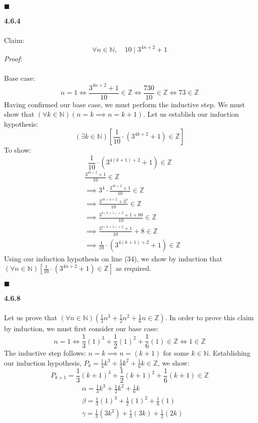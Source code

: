\documentclass[12pt]{article}
\begin{document}
\begin{flushright}
$\blacksquare$
\end{flushright}
\textbf{4.6.4}\\\\
Claim: $$\forall n \in \mathbb{N}, \quad 10 \mid 3^{4n+2}+1$$
\emph{Proof}:\\\\
Base case: $$n=1 \iff \frac{3^{4n+2}+1}{10} \in \mathbb{Z} \iff \frac{730}{10} \in \mathbb{Z} \iff 73 \in \mathbb{Z}$$
Having confirmed our base case, we must perform the inductive step. We must show that $(\forall k \in \mathbb{N})(n=k \implies n=k+1)$. Let us establish our induction hypothesis: $$(\exists k \in \mathbb{N})\left[\frac{1}{10}\cdot (3^{4k+2}+1) \in \mathbb{Z}\right]$$
To show: $$\boxed{\frac{1}{10}\cdot (3^{4(k+1)+2}+1) \in \mathbb{Z}}$$
\begin{align}
& \frac{3^{4k+2}+1}{10} \in \mathbb{Z}\\
&\implies 3^4 \cdot \frac{3^{4k+2}+1}{10} \in \mathbb{Z}\\
&\implies \frac{3^{4k+4+2}+3^4}{10} \in \mathbb{Z}\\
&\implies \frac{3^{4(k+1)+2}+1+80}{10} \in \mathbb{Z}\\
&\implies \frac{3^{4(k+1)+2}+1}{10}+8 \in \mathbb{Z}\\
&\implies \frac{1}{10}\cdot (3^{4(k+1)+2}+1) \in \mathbb{Z}
\end{align}
Using our induction hypothesis on line (34), we show by induction that $(\forall n \in \mathbb{N})\left[\frac{1}{10}\cdot (3^{4n+2}+1) \in \mathbb{Z}\right]$ as required.
\begin{flushright}
$\blacksquare$
\end{flushright}
\textbf{4.6.8}\\\\
Let us prove that $(\forall n \in \mathbb{N})\left(\frac{1}{3}n^3+\frac{1}{2}n^2+\frac{1}{6}n \in \mathbb{Z}\right)$. 
In order to prove this claim by induction, we must first consider our base case: $$n=1 \iff \frac{1}{3}(1)^3+\frac{1}{2}(1)^2+\frac{1}{6}(1) \in \mathbb{Z} \iff 1 \in \mathbb{Z}$$
The inductive step follows: $n=k \implies n=(k+1)$ for some $k \in \mathbb{N}$. Establishing our induction hypothesis, $P_k = \frac{1}{3}k^3+\frac{1}{2}k^2+\frac{1}{6}k \in \mathbb{Z}$, we show:
$$\boxed{P_{k+1} = \frac{1}{3}(k+1)^3+\frac{1}{2}(k+1)^2+\frac{1}{6}(k+1) \in \mathbb{Z}}$$
\begin{align}
&\alpha = \frac{1}{3}k^3+\frac{1}{2}k^2+\frac{1}{6}k\\
&\beta = \frac{1}{3}(1)^3+\frac{1}{2}(1)^2+\frac{1}{6}(1)\\
&\gamma = \frac{1}{3}(3k^2)+\frac{1}{3}(3k)+\frac{1}{2}(2k) 
\end{align}
\end{document}
